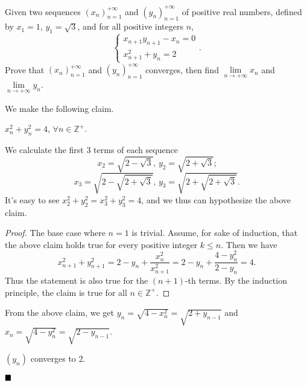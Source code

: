 \documentclass[11pt]{article}
\newenvironment{solution}[1][Solution]{%
  \proof[\normalfont \faPenNib \hspace{0.2cm} \ttfamily \scshape \large #1]%
}{\(\hfill \blacksquare\){\parfillskip0pt\par}}
\theoremstyle{definition}
\begin{document}
        \begin{problem}
            Given two sequences \((x_n)_{n=1}^{+\infty}\) and \((y_n)_{n=1}^{+\infty}\) of positive real numbers, defined by \(x_1 = 1\), \(y_1 = \sqrt{3}\), and for all positive integers \(n\),
            \[\begin{cases}
                x_{n+1}y_{n+1} - x_n = 0 \\
                x_{n+1}^2 + y_n = 2
            \end{cases}.\]
            Prove that \((x_n)_{n=1}^{+\infty}\) and \((y_n)_{n=1}^{+\infty}\) converges, then find \(\lim\limits_{n \to +\infty} x_n\) and \(\lim\limits_{n \to +\infty} y_n\).
        \end{problem}

        \begin{solution}
            We make the following claim.
            
            \begin{claim}
                \(x_n^2 + y_n^2 = 4\), \(\forall n \in \mathbb{Z}^+\).
            \end{claim}
            
            \begin{motivation}
                We calculate the first 3 terms of each sequence
                \[x_2 = \sqrt{2 - \sqrt{3}} \text{, } y_2 = \sqrt{2 + \sqrt{3}} \text{;}\]
                \[x_3 = \sqrt{2 - \sqrt{2 + \sqrt{3}}} \text{, } y_3 = \sqrt{2 + \sqrt{2 + \sqrt{3}}}.\]
                It's easy to see \(x_2^2 + y_2^2 = x_3^2 + y_3^2 = 4\), and we thus can hypothesize the above claim.
            \end{motivation}

            \begin{proof}
                The base case where \(n = 1\) is trivial. Assume, for sake of induction, that the above claim holds true for every positive integer \(k \leq n\). Then we have
                \[x_{n+1}^2 + y_{n+1}^2 = 2 - y_n + \frac{x_n^2}{x_{n+1}^2} = 2 - y_n + \frac{4 - y_n^2}{2 - y_n} = 4.\]
                Thus the statement is also true for the \((n + 1)\)-th terms. By the induction principle, the claim is true for all \(n \in \mathbb{Z}^+\).
            \end{proof}

            From the above claim, we get \(y_n = \sqrt{4 - x_n^2} = \sqrt{2 + y_{n-1}}\) and \(x_n = \sqrt{4 - y_n^2} = \sqrt{2 - {y_{n-1}}}\).

            \begin{claim}
                \((y_n)\) converges to 2.
            \end{claim}


\end{solution}
\end{document}
